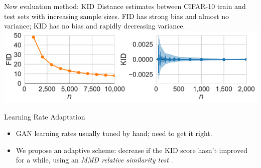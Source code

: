 \documentclass[xcolor={table}]{beamer}
\begin{document}
\begin{frame}{}
\begin{columns}[T, totalwidth=\textwidth]
\begin{column}{.32\textwidth}
\begin{block}{New evaluation method: KID}
      Distance estimates between CIFAR-10 train and test sets with increasing sample sizes.
      FID has strong bias and almost no variance;
      KID has no bias and rapidly decreasing variance.
      \\
      \includegraphics[width=\columnwidth]{figs/fid-kid-bias-comparison.pdf}

    \end{block}

    \begin{block}{Learning Rate Adaptation}
      \begin{itemize}
        \item GAN learning rates usually tuned by hand; need to get it right.
        \item We propose an adaptive scheme: decrease if the KID score hasn't improved for a while, using an \emph{MMD relative similarity test} \parencite{3sample}.
      \end{itemize}
    \end{block}

    \printbibliography
  \end{column}

\end{columns}


\end{frame}
\end{document}
